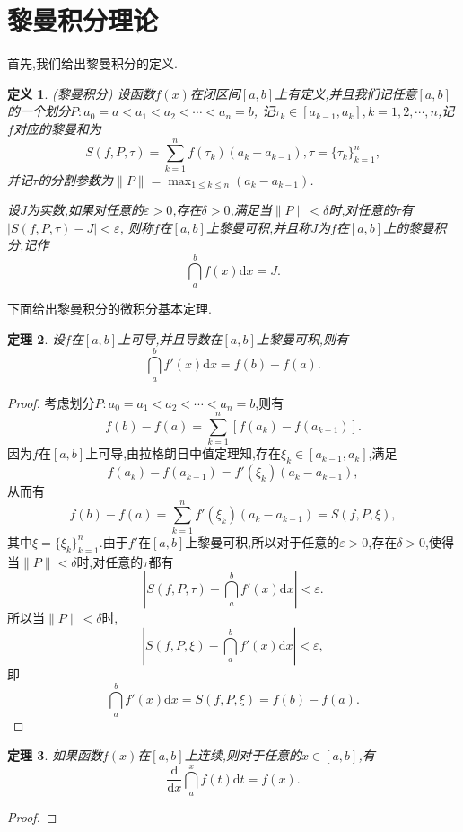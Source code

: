 \documentclass[a4paper,12pt]{article}
\newtheorem{theorem}{定理}[section]
\newtheorem{definition}[theorem]{定义}
\begin{document}
{        \section{黎曼积分理论}
            首先,我们给出黎曼积分的定义.
            \begin{definition}{\emph{(}黎曼积分\emph{)}}
                设函数$f(x)$在闭区间$[a,b]$上有定义,并且我们记任意$[a,b]$的一个划分$P:a_0=a<a_1<a_2<\cdots<a_n=b$,
                记$\tau_k\in[a_{k-1},a_k],k=1,2,\cdots,n$,记$f$对应的黎曼和为
                $$S(f,P,\tau)=\sum_{k=1}^nf(\tau_k)(a_k-a_{k-1}),\tau=\{\tau_k\}_{k=1}^n,$$
                并记$\tau$的分割参数为$\|P\|=\max_{1\leqslant k\leqslant n}(a_k-a_{k-1})$.

                设$J$为实数,如果对任意的$\varepsilon>0$,存在$\delta>0$,满足当$\|P\|<\delta$时,对任意的$\tau$有$|S(f,P,\tau)-J|<\varepsilon$,
                则称$f$在$[a,b]$上黎曼可积,并且称$J$为$f$在$[a,b]$上的黎曼积分,记作
                $$\dint_a^bf(x)\mathrm{d}x=J.$$
            \end{definition}
            下面给出黎曼积分的微积分基本定理.
            \begin{theorem}
                设$f$在$[a,b]$上可导,并且导数在$[a,b]$上黎曼可积,则有
                $$\dint\limits_a^bf'(x)\mathrm{d}x=f(b)-f(a).$$
            \end{theorem}
            \begin{proof}
                考虑划分$P:a_0=a_1<a_2<\cdots<a_n=b$,则有$$f(b)-f(a)=\sum_{k=1}^n[f(a_k)-f(a_{k-1})].$$
                因为$f$在$[a,b]$上可导,由拉格朗日中值定理知,存在$\xi_k\in[a_{k-1},a_k]$,满足$$f(a_k)-f(a_{k-1})=f'(\xi_k)(a_k-a_{k-1}),$$
                从而有$$f(b)-f(a)=\sum_{k=1}^nf'(\xi_k)(a_k-a_{k-1})=S(f,P,\xi),$$
                其中$\xi=\{\xi_k\}_{k=1}^n$.由于$f'$在$[a,b]$上黎曼可积,所以对于任意的$\varepsilon>0$,存在$\delta>0$,使得
                当$\|P\|<\delta$时,对任意的$\tau$都有$$\left|S(f,P,\tau)-\dint_a^bf'(x)\mathrm{d}x\right|<\varepsilon.$$
                所以当$\|P\|<\delta$时,$$\left|S(f,P,\xi)-\dint_a^bf'(x)\mathrm{d}x\right|<\varepsilon,$$
                即$$\dint_a^bf'(x)\mathrm{d}x=S(f,P,\xi)=f(b)-f(a).$$
            \end{proof}
            \begin{theorem}
                如果函数$f(x)$在$[a,b]$上连续,则对于任意的$x\in[a,b]$,有
                $$\dfrac{\mathrm{d}}{\mathrm{d}x}\dint_a^xf(t)\mathrm{d}t=f(x).$$
            \end{theorem}
            \begin{proof}

\end{proof}}
\end{document}
